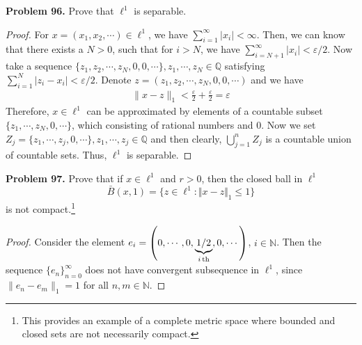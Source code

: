 \documentclass[12pt,leqno]{amsart}
\theoremstyle{definition}
\numberwithin{equation}{subsection}
\begin{document}
\medskip

\noindent
{\bf Problem 96.}
Prove that $\ell^1$ is separable.
\begin{proof}
For $x = (x_1,x_2,\cdots)\in\ell^1$, we have $\sum^\infty_{i=1}\left| x_i\right| < \infty$. Then, we can know that there exists a $N > 0$, such that for $i > N$, we have $\sum^\infty_{i = N+1}\left| x_i\right| < \varepsilon/2$. Now take a sequence $\{z_1,z_2,\cdots, z_N, 0,0,\cdots \},z_1,\cdots,z_N\in\mathbb{Q}$ satisfying $\sum^N_{i=1}\left|z_i - x_i\right| < \varepsilon/2$. Denote $z = (z_1,z_2,\cdots, z_N, 0,0,\cdots)$ and we have
\begin{align*}
    \|x - z\|_1 < \frac{\varepsilon}{2} + \frac{\varepsilon}{2} = \varepsilon 
\end{align*}
Therefore, $x\in \ell^1$ can be approximated by elements of a countable subset $\{z_1,\cdots, z_N, 0,\cdots\}$, which consisting of rational numbers and $0$. Now we set $Z_j = \{z_1,\cdots, z_j, 0,\cdots\}, z_1,\cdots,z_j\in\mathbb{Q}$ and then clearly, $\bigcup^n_{j=1}Z_j$ is a countable union of countable sets. Thus, $\ell^1$ is separable. 
\end{proof}

\medskip

\noindent
{\bf Problem 97.}
Prove that if $x\in\ell^1$ and $r> 0$, then the closed ball  in $\ell^1$
$$
\bar{B}(x,1)=\{z\in\ell^1: \Vert x-z\Vert_1\leq 1\}
$$
is not compact.\footnote{This provides an example of a complete metric space where bounded and closed sets are not necessarily compact.}
\begin{proof}
Consider the element $e_i = \left(0,\cdots,0, \underbrace{1/2}_{i\,{\rm th}}, 0,\cdots \right)$, $i\in \mathbb{N}$. Then the sequence $\{e_n\}^\infty_{n=0}$ does not have convergent subsequence in $\ell^1$, since $\|e_n - e_m\|_1 = 1$ for all $n,m\in\mathbb{N}$.
\end{proof}

\medskip
\end{document}
